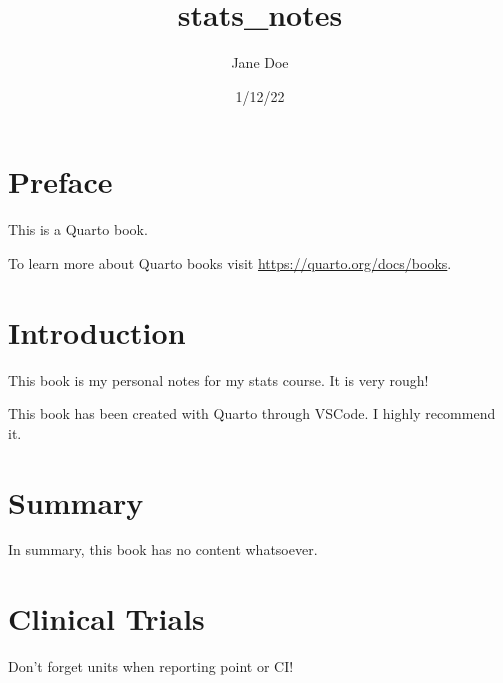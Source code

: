 \documentclass[
  letterpaper,
  DIV=11,
  numbers=noendperiod]{scrreprt}
\title{stats\_notes}
\author{Jane Doe}
\date{1/12/22}
\renewcommand*\contentsname{Table of contents}
\newcommand\contentsname{Table of contents}
\begin{document}
\maketitle
\ifdefined\Shaded\renewenvironment{Shaded}{\begin{tcolorbox}[interior hidden, borderline west={3pt}{0pt}{shadecolor}, breakable, frame hidden, enhanced, boxrule=0pt, sharp corners]}{\end{tcolorbox}}\fi

\renewcommand*\contentsname{Table of contents}
{
\hypersetup{linkcolor=}
\setcounter{tocdepth}{2}
\tableofcontents
}

\hypertarget{preface}{%
\chapter*{Preface}\label{preface}}


This is a Quarto book.

To learn more about Quarto books visit
\url{https://quarto.org/docs/books}.


\hypertarget{introduction}{%
\chapter{Introduction}\label{introduction}}

This book is my personal notes for my stats course. It is very rough!

This book has been created with Quarto through VSCode. I highly
recommend it.


\hypertarget{summary}{%
\chapter{Summary}\label{summary}}

In summary, this book has no content whatsoever.


\hypertarget{clinical-trials}{%
\chapter{Clinical Trials}\label{clinical-trials}}

Don't forget units when reporting point or CI!
\end{document}
